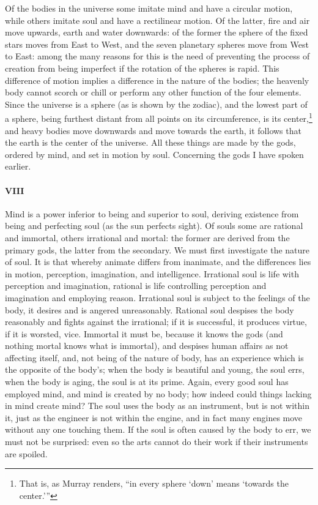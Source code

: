\documentclass[12pt]{article}
\begin{document}
Of the bodies in the universe some imitate mind and have a circular motion,
while others imitate soul and have a rectilinear motion. Of the latter, fire
and air move upwards, earth and water downwards: of the former the sphere of
the fixed stars moves from East to West, and the seven planetary spheres move
from West to East: among the many reasons for this is the need of preventing
the process of creation from being imperfect if the rotation of the spheres is
rapid. This difference of motion implies a difference in the nature of the
bodies; the heavenly body cannot scorch or chill or perform any other function
of the four elements. Since the universe is a sphere (as is shown by the
zodiac), and the lowest part of a sphere, being furthest distant from all
points on its circumference, is its center,\footnote{That is, as Murray
renders, ``in every sphere `down' means `towards the center.'{''}} and heavy
bodies move downwards and move towards the earth, it follows that the earth is
the center of the universe. All these things are made by the gods, ordered by
mind, and set in motion by soul. Concerning the gods I have spoken earlier.

\paragraph{VIII} Mind is a power inferior to being and superior to soul,
deriving existence from being and perfecting soul (as the sun perfects sight).
Of souls some are rational and immortal, others irrational and mortal: the
former are derived from the primary gods, the latter from the secondary. We
must first investigate the nature of soul. It is that whereby animate differs
from inanimate, and the differences lies in motion, perception, imagination,
and intelligence. Irrational soul is life with perception and imagination,
rational is life controlling perception and imagination and employing reason.
Irrational soul is subject to the feelings of the body, it desires and is
angered unreasonably. Rational soul despises the body reasonably and fights
against the irrational; if it is successful, it produces virtue, if it is
worsted, vice. Immortal it must be, because it knows the gods (and nothing
mortal knows what is immortal), and despises human affairs as not affecting
itself, and, not being of the nature of body, has an experience which is the
opposite of the body's; when the body is beautiful and young, the soul errs,
when the body is aging, the soul is at its prime. Again, every good soul has
employed mind, and mind is created by no body; how indeed could things lacking
in mind create mind? The soul uses the body as an instrument, but is not within
it, just as the engineer is not within the engine, and in fact many engines
move without any one touching them. If the soul is often caused by the body to
err, we must not be surprised: even so the arts cannot do their work if their
instruments are spoiled.
\end{document}
